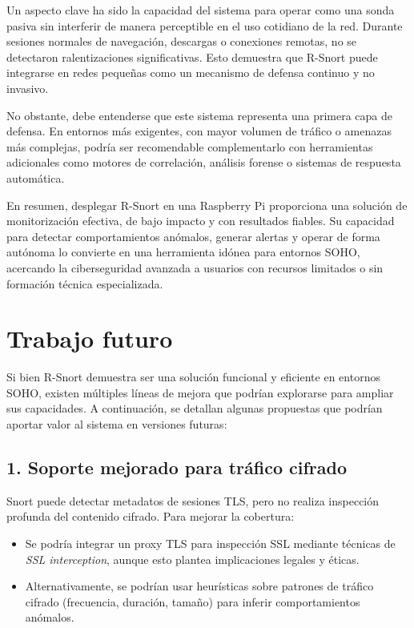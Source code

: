 \documentclass[11pt,a4paper,twoside]{report}
\begin{document}
Un aspecto clave ha sido la capacidad del sistema para operar como una sonda pasiva sin interferir de manera perceptible en el uso cotidiano de la red. Durante sesiones normales de navegación, descargas o conexiones remotas, no se detectaron ralentizaciones significativas. Esto demuestra que R-Snort puede integrarse en redes pequeñas como un mecanismo de defensa continuo y no invasivo.\newline

No obstante, debe entenderse que este sistema representa una primera capa de defensa. En entornos más exigentes, con mayor volumen de tráfico o amenazas más complejas, podría ser recomendable complementarlo con herramientas adicionales como motores de correlación, análisis forense o sistemas de respuesta automática.\newline

En resumen, desplegar R-Snort en una Raspberry Pi proporciona una solución de monitorización efectiva, de bajo impacto y con resultados fiables. Su capacidad para detectar comportamientos anómalos, generar alertas y operar de forma autónoma lo convierte en una herramienta idónea para entornos SOHO, acercando la ciberseguridad avanzada a usuarios con recursos limitados o sin formación técnica especializada.


\chapter*{Trabajo futuro}

Si bien R-Snort demuestra ser una solución funcional y eficiente en entornos SOHO, existen múltiples líneas de mejora que podrían explorarse para ampliar sus capacidades. A continuación, se detallan algunas propuestas que podrían aportar valor al sistema en versiones futuras:

\section*{1. Soporte mejorado para tráfico cifrado}

Snort puede detectar metadatos de sesiones TLS, pero no realiza inspección profunda del contenido cifrado. Para mejorar la cobertura:

\begin{itemize}
	\item Se podría integrar un proxy TLS para inspección SSL mediante técnicas de \textit{SSL interception}, aunque esto plantea implicaciones legales y éticas.
	\item Alternativamente, se podrían usar heurísticas sobre patrones de tráfico cifrado (frecuencia, duración, tamaño) para inferir comportamientos anómalos.
\end{itemize}
\end{document}
